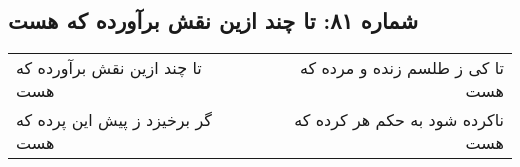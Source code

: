 \begin{center}
\section*{شماره ۸۱: تا چند ازین نقش برآورده که هست}
\label{sec:081}
\begin{longtable}{l p{0.5cm} r}
تا چند ازین نقش برآورده که هست
&&
تا کی ز طلسم زنده و مرده که هست
\\
گر برخیزد ز پیش این پرده که هست
&&
ناکرده شود به حکم هر کرده که هست
\\
\end{longtable}
\end{center}
